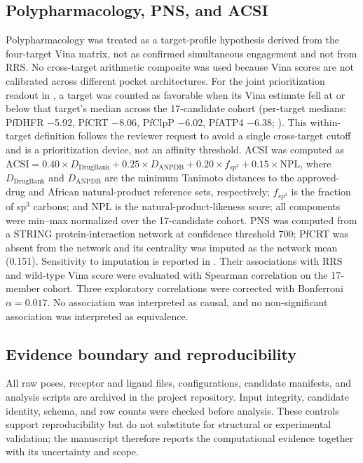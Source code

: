 \documentclass[journal=jcisd8,manuscript=article]{achemso}
\begin{document}
\subsection{Polypharmacology, PNS, and ACSI}\label{sec:methods_pns}
Polypharmacology was treated as a target-profile hypothesis derived from the four-target Vina matrix, not as confirmed simultaneous engagement and not from RRS. No cross-target arithmetic composite was used because Vina scores are not calibrated across different pocket architectures. For the joint prioritization readout in , a target was counted as favorable when its Vina estimate fell at or below that target's median across the \num{17}-candidate cohort (per-target medians: PfDHFR \num{-5.92}, PfCRT \num{-8.06}, PfClpP \num{-6.02}, PfATP4 \num{-6.38}; ). This within-target definition follows the reviewer request to avoid a single cross-target cutoff and is a prioritization device, not an affinity threshold. ACSI was computed as $\mathrm{ACSI}=\num{0.40}\times D_{\mathrm{DrugBank}}+\num{0.25}\times D_{\mathrm{ANPDB}}+\num{0.20}\times f_{sp^3}+\num{0.15}\times\mathrm{NPL}$, where $D_{\mathrm{DrugBank}}$ and $D_{\mathrm{ANPDB}}$ are the minimum Tanimoto distances to the approved-drug and African natural-product reference sets, respectively; $f_{sp^3}$ is the fraction of sp$^3$ carbons; and NPL is the natural-product-likeness score; all components were min--max normalized over the 17-candidate cohort. PNS was computed from a STRING protein-interaction network at confidence threshold \num{700}; PfCRT was absent from the network and its centrality was imputed as the network mean (\num{0.151}). Sensitivity to imputation is reported in . Their associations with RRS and wild-type Vina score were evaluated with Spearman correlation on the 17-member cohort. Three exploratory correlations were corrected with Bonferroni $\alpha=\num{0.017}$. No association was interpreted as causal, and no non-significant association was interpreted as equivalence.

\subsection{Evidence boundary and reproducibility}\label{sec:methods_boundary}
All raw poses, receptor and ligand files, configurations, candidate manifests, and analysis scripts are archived in the project repository. Input integrity, candidate identity, schema, and row counts were checked before analysis. These controls support reproducibility but do not substitute for structural or experimental validation; the manuscript therefore reports the computational evidence together with its uncertainty and scope.
\end{document}
